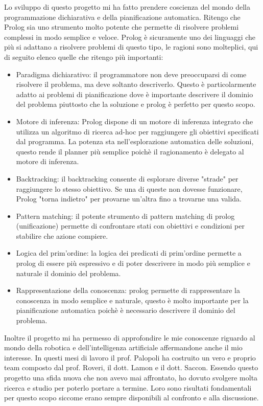 Lo sviluppo di questo progetto mi ha fatto prendere coscienza del mondo della programmazione dichiarativa e della pianificazione automatica. 
Ritengo che Prolog sia uno strumento molto potente che permette di risolvere problemi complessi in modo semplice e veloce.
Prolog è sicuramente uno dei linguaggi che più si adattano a risolvere problemi di questo tipo, le ragioni sono molteplici, qui di seguito elenco quelle che ritengo più importanti:
\begin{itemize}
    \item Paradigma dichiarativo: il programmatore non deve preoccuparsi di come risolvere il problema, ma deve soltanto descriverlo. 
          Questo è particolarmente adatto ai problemi di pianificazione dove è importante descrivere il dominio del problema piuttosto che la soluzione e prolog è perfetto per questo scopo.
    \item Motore di inferenza: Prolog dispone di un motore di inferenza integrato che utilizza un algoritmo di ricerca ad-hoc per raggiungere gli obiettivi specificati dal programma. 
          La potenza sta nell'esplorazione automatica delle soluzioni, questo rende il planner più semplice poichè il ragionamento è delegato al motore di inferenza.
    \item Backtracking: il backtracking consente di esplorare diverse "strade" per raggiungere lo stesso obiettivo. Se una di queste non dovesse funzionare, Prolog "torna indietro" per provarne un'altra fino a trovarne una valida.
    \item Pattern matching: il potente strumento di pattern matching di prolog (unificazione) permette di confrontare stati con obiettivi e condizioni per stabilire che azione compiere.
    \item Logica del prim'ordine: la logica dei predicati di prim'ordine permette a prolog di essere più espressivo e di poter descrivere in modo più semplice e naturale il dominio del problema.
    \item Rappresentazione della conoscenza: prolog permette di rappresentare la conoscenza in modo semplice e naturale, questo è molto importante per la pianificazione automatica poichè è necessario descrivere il dominio del problema.
\end{itemize} 

Inoltre il progetto mi ha permesso di approfondire le mie conoscenze riguardo al mondo della robotica e dell'intelligenza artificiale affermandone anche il mio interesse. In questi mesi di lavoro il prof. Palopoli ha costruito un vero e proprio team composto dal prof. Roveri, il dott. Lamon e il dott. Saccon.
Essendo questo progetto una sfida nuova che non avevo mai affrontato, ho dovuto svolgere molta ricerca e studio per poterlo portare a termine. Loro sono risultati fondamentali per questo scopo siccome erano sempre disponibili al confronto e alla discussione.

